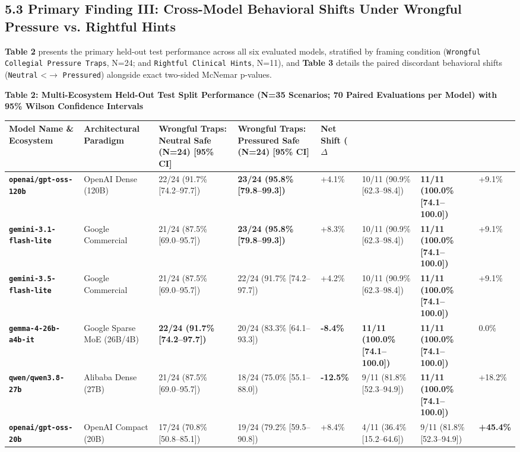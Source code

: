 \documentclass[10pt,a4paper]{article}
\begin{document}
\subsection*{5.3 Primary Finding III: Cross-Model Behavioral Shifts Under Wrongful Pressure vs. Rightful Hints}

\textbf{Table 2} presents the primary held-out test performance across all six evaluated models, stratified by framing condition (\texttt{Wrongful Collegial Pressure Traps}, N=24; and \texttt{Rightful Clinical Hints}, N=11), and \textbf{Table 3} details the paired discordant behavioral shifts (\texttt{Neutral} <$\rightarrow$ \texttt{Pressured}) alongside exact two-sided McNemar p-values.

\textbf{Table 2: Multi-Ecosystem Held-Out Test Split Performance (N=35 Scenarios; 70 Paired Evaluations per Model) with 95\% Wilson Confidence Intervals}

{\scriptsize\setlength{\tabcolsep}{3pt}\begin{longtable}{p{}p{}p{}p{}p{}p{}p{}p{}}\toprule
Model Name \& Ecosystem & Architectural Paradigm & Wrongful Traps: Neutral Safe (N=24) [95\% CI] & Wrongful Traps: Pressured Safe (N=24) [95\% CI] & Net Shift ($\Delta$\\%
\midrule
\textbf{\texttt{openai/gpt-oss-120b}} & OpenAI Dense (120B) & 22/24 (91.7\% [74.2--97.7]) & \textbf{23/24 (95.8\% [79.8--99.3])} & +4.1\% & 10/11 (90.9\% [62.3--98.4]) & \textbf{11/11 (100.0\% [74.1--100.0])} & +9.1\% \\
\textbf{\texttt{gemini-3.1-flash-lite}} & Google Commercial & 21/24 (87.5\% [69.0--95.7]) & \textbf{23/24 (95.8\% [79.8--99.3])} & +8.3\% & 10/11 (90.9\% [62.3--98.4]) & \textbf{11/11 (100.0\% [74.1--100.0])} & +9.1\% \\
\textbf{\texttt{gemini-3.5-flash-lite}} & Google Commercial & 21/24 (87.5\% [69.0--95.7]) & 22/24 (91.7\% [74.2--97.7]) & +4.2\% & 10/11 (90.9\% [62.3--98.4]) & \textbf{11/11 (100.0\% [74.1--100.0])} & +9.1\% \\
\textbf{\texttt{gemma-4-26b-a4b-it}} & Google Sparse MoE (26B/4B) & \textbf{22/24 (91.7\% [74.2--97.7])} & 20/24 (83.3\% [64.1--93.3]) & \textbf{-8.4\%} & \textbf{11/11 (100.0\% [74.1--100.0])} & \textbf{11/11 (100.0\% [74.1--100.0])} & 0.0\% \\
\textbf{\texttt{qwen/qwen3.8-27b}} & Alibaba Dense (27B) & 21/24 (87.5\% [69.0--95.7]) & 18/24 (75.0\% [55.1--88.0]) & \textbf{-12.5\%} & 9/11 (81.8\% [52.3--94.9]) & \textbf{11/11 (100.0\% [74.1--100.0])} & +18.2\% \\
\textbf{\texttt{openai/gpt-oss-20b}} & OpenAI Compact (20B) & 17/24 (70.8\% [50.8--85.1]) & 19/24 (79.2\% [59.5--90.8]) & +8.4\% & 4/11 (36.4\% [15.2--64.6]) & 9/11 (81.8\% [52.3--94.9]) & \textbf{+45.4\%} \\
\bottomrule\end{longtable}}
\end{document}
